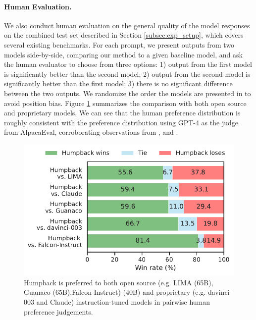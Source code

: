 \paragraph{Human Evaluation.} We also conduct human evaluation on the general quality of the model responses on the combined test set described in Section \ref{subsec:exp_setup}, which covers several existing benchmarks. For each prompt, we present outputs from two models side-by-side, comparing our method to a given baseline model, and ask the human evaluator to choose from three options: 1) output from the first model is significantly better than the second model; 2) output from the second model is significantly better than the first model; 3) there is no significant difference between the two outputs. We randomize the order the models are presented in to avoid position bias. Figure \ref{fig:human_eval_pref} summarizes the comparison with both open source and proprietary models. We can see that the human preference distribution is roughly consistent with the preference distribution using GPT-4 as the judge from AlpacaEval, corroborating observations from \citet{alpaca_eval}, \citet{zhou2023lima} and \citet{zheng2023judging}.  


\begin{figure}
  \centering
  \includegraphics[width=0.65\columnwidth]{figs/human_eval_pref.pdf}
  \caption{Humpback is preferred to both open source (e.g. LIMA\citep{zhou2023lima} (65B), Guanaco \citep{dettmers2023qlora} (65B),Falcon-Instruct\citep{falcon40b}) (40B) and proprietary (e.g. davinci-003\citep{ouyang2022training} and Claude\citep{bai2022training}) instruction-tuned models in pairwise human preference judgements.}
  \label{fig:human_eval_pref}
  \vspace{-3mm}
\end{figure}


